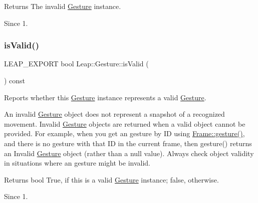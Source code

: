 \begin{DoxyCodeInclude}
\end{DoxyCodeInclude}


\begin{DoxyReturn}{Returns}
The invalid \hyperlink{class_leap_1_1_gesture}{Gesture} instance. 
\end{DoxyReturn}
\begin{DoxySince}{Since}
1. 
\end{DoxySince}
\mbox{\label{class_leap_1_1_gesture_a3130fbe24db5a9fe70793ee7d7094e58}} 
\subsubsection{\texorpdfstring{is\+Valid()}{isValid()}}
{\footnotesize\ttfamily L\+E\+A\+P\+\_\+\+E\+X\+P\+O\+RT bool Leap\+::\+Gesture\+::is\+Valid (\begin{DoxyParamCaption}{ }\end{DoxyParamCaption}) const}

Reports whether this \hyperlink{class_leap_1_1_gesture}{Gesture} instance represents a valid \hyperlink{class_leap_1_1_gesture}{Gesture}.

An invalid \hyperlink{class_leap_1_1_gesture}{Gesture} object does not represent a snapshot of a recognized movement. Invalid \hyperlink{class_leap_1_1_gesture}{Gesture} objects are returned when a valid object cannot be provided. For example, when you get an gesture by ID using \hyperlink{class_leap_1_1_frame_a107df376205952e9ade4237592494a0e}{Frame\+::gesture()}, and there is no gesture with that ID in the current frame, then gesture() returns an Invalid \hyperlink{class_leap_1_1_gesture}{Gesture} object (rather than a null value). Always check object validity in situations where an gesture might be invalid.


\begin{DoxyCodeInclude}
\end{DoxyCodeInclude}


\begin{DoxyReturn}{Returns}
bool True, if this is a valid \hyperlink{class_leap_1_1_gesture}{Gesture} instance; false, otherwise. 
\end{DoxyReturn}
\begin{DoxySince}{Since}
1. 
\end{DoxySince}
\mbox{\label{class_leap_1_1_gesture_a025bb8bc32d63de8a97406d947cec5d6}} 
